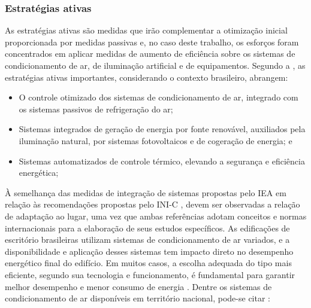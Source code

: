 \subsubsection{Estratégias ativas}
As estratégias ativas são medidas que irão complementar a otimização inicial proporcionada por medidas passivas e, no caso deste trabalho, os esforços foram concentrados em aplicar medidas de aumento de eficiência sobre os sistemas de condicionamento de ar, de iluminação artificial e de equipamentos. Segundo a \textit{\textcite{InternationalEnergyAgency-IEA2014}}, as estratégias ativas importantes, considerando o contexto brasileiro, abrangem:
    \begin{itemize}
        \item O controle otimizado dos sistemas de condicionamento de ar, integrado com os sistemas passivos de refrigeração do ar;
        \item Sistemas integrados de geração de energia por fonte renovável, auxiliados pela iluminação natural, por sistemas fotovoltaicos e de cogeração de energia; e
        \item Sistemas automatizados de controle térmico, elevando a segurança e eficiência energética;
    \end{itemize}
À semelhança das medidas de integração de sistemas propostas pelo IEA em relação às recomendações propostas pelo INI-C \cite{InstitutoNacionaldeMetrologiaNormalizacaoeQualidadeIndustrial-INMETRO2018}, devem ser observadas a relação de adaptação ao lugar, uma vez que ambas referências adotam conceitos e normas internacionais para a elaboração de seus estudos específicos.\vspace*{0.3cm} \newline
As edificações de escritório brasileiras utilizam sistemas de condicionamento de ar variados, e a disponibilidade e aplicação desses sistemas tem impacto direto no desempenho energético final do edifício. Em muitos casos, a escolha adequada do tipo mais eficiente, segundo sua tecnologia e funcionamento, é fundamental para garantir melhor desempenho e menor consumo de energia \cite{Kamal2019,Shin2019}. Dentre os sistemas de condicionamento de ar disponíveis em território nacional, pode-se citar \cite{ConselhoBrasileirodeConstrucaoSustentavel-CBCS2015}:
